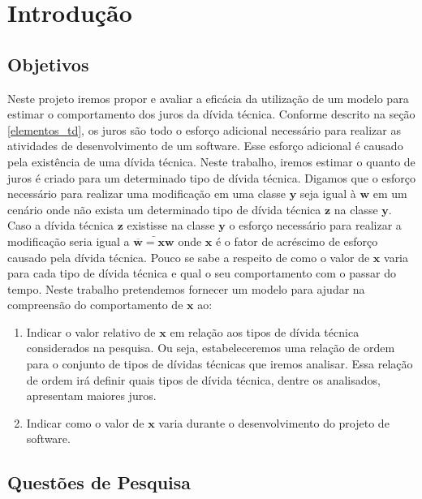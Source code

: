 \chapter{Introdução}





\section{Objetivos}

Neste projeto iremos propor e avaliar a eficácia da utilização de um modelo para estimar o comportamento dos juros da dívida técnica. Conforme descrito na seção \ref{elementos_td}, os juros são todo o esforço adicional necessário para realizar as atividades de desenvolvimento de um software. Esse esforço adicional é causado pela existência de uma dívida técnica. Neste trabalho, iremos estimar o quanto de juros é criado para um determinado tipo de dívida técnica. Digamos que o esforço necessário para realizar uma modificação em uma classe $\textbf{y}$ seja igual à $\textbf{w}$ em um cenário onde não exista um determinado tipo de dívida técnica $\textbf{z}$ na classe $\textbf{y}$. Caso a dívida técnica $\textbf{z}$ existisse na classe $\textbf{y}$ o esforço necessário para realizar a modificação seria igual a $\bar{\overline{\textbf{w}}  = \textbf{xw}}$  onde $\textbf{x}$  é o fator de acréscimo  de esforço causado pela dívida técnica.  Pouco se sabe a respeito de como o valor de $\textbf{x}$  varia para cada tipo de dívida técnica e qual o seu comportamento com o passar do tempo. Neste trabalho pretendemos fornecer um modelo para ajudar na compreensão do comportamento de $\textbf{x}$ ao:

\begin{enumerate}
\item Indicar o valor relativo de $\textbf{x}$ em relação aos tipos de dívida técnica considerados na pesquisa. Ou seja, estabeleceremos uma relação de ordem para o conjunto de tipos de dívidas técnicas que iremos analisar. Essa relação de ordem irá definir quais tipos de dívida técnica, dentre os analisados, apresentam maiores juros.
\item Indicar como o valor de $\textbf{x}$ varia durante o desenvolvimento do projeto de software. 

\end{enumerate}



\section{Questões de Pesquisa}

